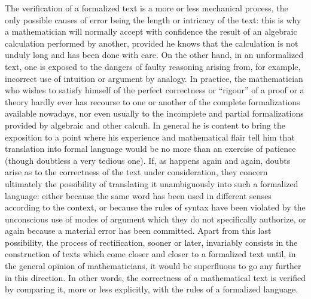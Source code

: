 The verification of a formalized text is a more or less mechanical process, the only possible causes of error being the length or intricacy of the text: this is why a mathematician will normally accept with confidence the result of an algebraic calculation performed by another, provided he knows that the calculation is not unduly long and has been done with care. On the other hand, in an unformalized text, one is exposed to the dangers of faulty reasoning arising from, for example, incorrect use of intuition or argument by analogy. In practice, the mathematician who wishes to satisfy himself of the perfect correctness or ``rigour'' of a proof or a theory hardly ever has recourse to one or another of the complete formalizations available nowadays, nor even usually to the incomplete and partial formalizations provided by algebraic and other calculi. In general he is content to bring the exposition to a point where his experience and mathematical flair tell him that translation into formal language would be no more than an exercise of patience (though doubtless a very tedious one). If, as happens again and again, doubts arise as to the correctness of the text under consideration, they concern ultimately the possibility of translating it unambiguously into such a formalized language: either because the same word has been used in different senses according to the context, or because the rules of syntax have been violated by the unconscious use of modes of argument which they do not specifically authorize, or again because a material error has been committed. Apart from this last possibility, the process of rectification, sooner or later, invariably consists in the construction of texts which come closer and closer to a formalized text until, in the general opinion of mathematicians, it would be superfluous to go any further in this direction. In other words, the correctness of a mathematical text is verified by comparing it, more or less explicitly, with the rules of a formalized language.

